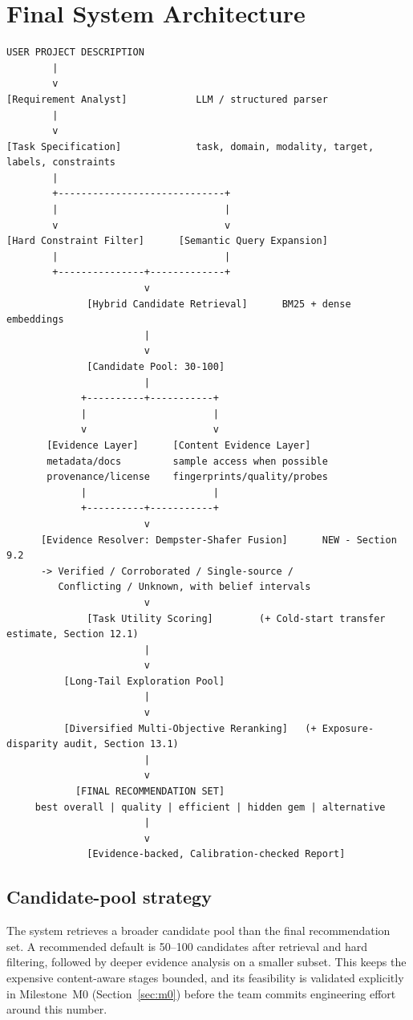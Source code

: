 \documentclass[11pt]{article}
\begin{document}
\section{Final System Architecture}
\begin{lstlisting}[basicstyle=\ttfamily\footnotesize]
USER PROJECT DESCRIPTION
        |
        v
[Requirement Analyst]            LLM / structured parser
        |
        v
[Task Specification]             task, domain, modality, target, labels, constraints
        |
        +-----------------------------+
        |                             |
        v                             v
[Hard Constraint Filter]      [Semantic Query Expansion]
        |                             |
        +---------------+-------------+
                        v
              [Hybrid Candidate Retrieval]      BM25 + dense embeddings
                        |
                        v
              [Candidate Pool: 30-100]
                        |
             +----------+-----------+
             |                      |
             v                      v
       [Evidence Layer]      [Content Evidence Layer]
       metadata/docs         sample access when possible
       provenance/license    fingerprints/quality/probes
             |                      |
             +----------+-----------+
                        v
      [Evidence Resolver: Dempster-Shafer Fusion]      NEW - Section 9.2
      -> Verified / Corroborated / Single-source /
         Conflicting / Unknown, with belief intervals
                        v
              [Task Utility Scoring]        (+ Cold-start transfer estimate, Section 12.1)
                        |
                        v
          [Long-Tail Exploration Pool]
                        |
                        v
          [Diversified Multi-Objective Reranking]   (+ Exposure-disparity audit, Section 13.1)
                        |
                        v
            [FINAL RECOMMENDATION SET]
     best overall | quality | efficient | hidden gem | alternative
                        |
                        v
              [Evidence-backed, Calibration-checked Report]
\end{lstlisting}

\subsection{Candidate-pool strategy}
The system retrieves a broader candidate pool than the final recommendation set. A recommended default is
50--100 candidates after retrieval and hard filtering, followed by deeper evidence analysis on a smaller
subset. This keeps the expensive content-aware stages bounded, and its feasibility is validated explicitly
in Milestone~M0 (Section~\ref{sec:m0}) before the team commits engineering effort around this number.
\end{document}
